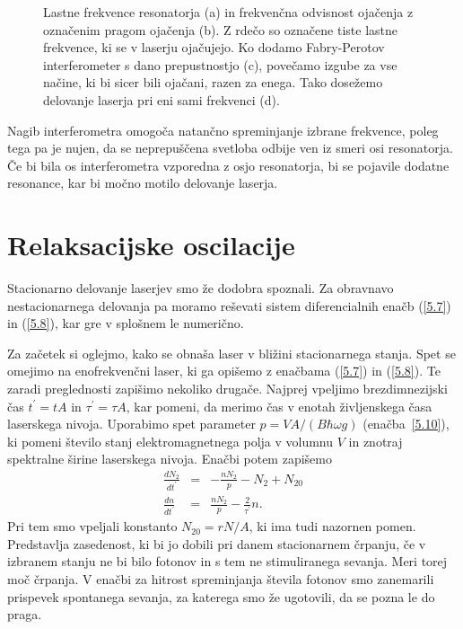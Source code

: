 \begin{figure}[h]
\centering
\def\svgwidth{100truemm} 

\caption{Lastne frekvence resonatorja (a) in frekvenčna odvisnost ojačenja z označenim 
pragom ojačenja (b). Z rdečo so označene tiste lastne frekvence, ki se v laserju ojačujejo. 
Ko dodamo Fabry-Perotov interferometer s dano prepustnostjo (c), povečamo
izgube za vse načine, ki bi sicer bili ojačani, razen za enega. 
Tako dosežemo delovanje laserja pri eni sami frekvenci (d).}
\label{fig:FPmodes}
\end{figure}

\begin{remark}
Nagib interferometra omogoča natančno spreminjanje izbrane frekvence, poleg tega
pa je nujen, da se neprepuščena svetloba odbije ven iz smeri osi resonatorja. Če bi 
bila os interferometra vzporedna z osjo resonatorja, bi se pojavile dodatne resonance, 
kar bi močno motilo delovanje laserja.
\end{remark}

\section{Relaksacijske oscilacije}
Stacionarno delovanje laserjev smo že dodobra spoznali. Za obravnavo
nestacionarnega delovanja pa moramo reševati sistem diferencialnih enačb 
(\ref{5.7}) in (\ref{5.8}), kar gre v splošnem le numerično.

Za začetek si oglejmo, kako se obnaša laser v bližini stacionarnega stanja. 
Spet se omejimo na enofrekvenčni laser, ki ga opišemo z enačbama (\ref{5.7})
in (\ref{5.8}). Te zaradi preglednosti zapišimo nekoliko drugače. Najprej vpeljimo 
brezdimnezijski čas $t^{\prime}=t A$ in $\tau^{\prime}=\tau A$, kar pomeni, da merimo 
čas v enotah življenskega časa laserskega nivoja. Uporabimo spet parameter
$p=VA/(B\hbar\omega g)$ (enačba~\ref{5.10}), ki pomeni število stanj 
elektromagnetnega polja v volumnu $V$ in znotraj spektralne širine laserskega nivoja. 
Enačbi potem zapišemo 
\begin{eqnarray}  
\frac{d N_2}{d t^{\prime}}&=&-\frac{nN_2}{p}-N_2+N_{20} \label{5.23a} \\
\frac{d n}{d t^{\prime}}& = & \frac{nN_2}{p}-\frac{2}{\tau^{\prime}}n.
\label{5.23}
\end{eqnarray}
Pri tem smo vpeljali konstanto $N_{20}= rN/A$, ki ima tudi nazornen pomen.
Predstavlja zasedenost, ki bi jo dobili pri danem stacionarnem črpanju, če v
izbranem stanju ne bi bilo fotonov in s tem ne stimuliranega sevanja. Meri torej 
moč črpanja. V enačbi za hitrost spreminjanja števila fotonov
smo zanemarili prispevek spontanega sevanja, za katerega smo že ugotovili,
da se pozna le do praga.

